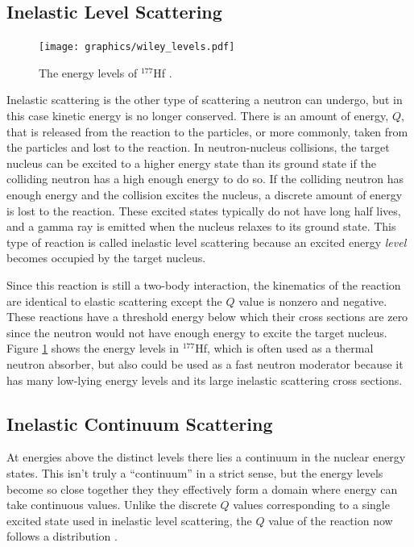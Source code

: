 \subsection{Inelastic Level Scattering}

\begin{figure}[h!]
  \centering
    \texttt{[image: graphics/wiley\_levels.pdf]}
     \caption[The energy levels of $^{177}$Hf.]{The energy levels of $^{177}$Hf \cite{krane}. \label{Elevels}}
\end{figure}

Inelastic scattering is the other type of scattering a neutron can undergo, but in this case kinetic energy is no longer conserved.  There is an amount of energy, $Q$, that is released from the reaction to the particles, or more commonly, taken from the particles and lost to the reaction.  In neutron-nucleus collisions, the target nucleus can be excited to a higher energy state than its ground state if the colliding neutron has a high enough energy to do so.  If the colliding neutron has enough energy and the collision excites the nucleus, a discrete amount of energy is lost to the reaction.  These excited states typically do not have long half lives, and a gamma ray is emitted when the nucleus relaxes to its ground state.  This type of reaction is called inelastic level scattering because an excited energy \emph{level} becomes occupied by the target nucleus.  

Since this reaction is still a two-body interaction, the kinematics of the reaction are identical to elastic scattering except the $Q$ value is nonzero and negative.  These reactions have a threshold energy below which their cross sections are zero since the neutron would not have enough energy to excite the target nucleus.   Figure \ref{Elevels} shows the energy levels in $^{177}$Hf, which is often used as a thermal neutron absorber, but also could be used as a fast neutron moderator because it has many low-lying energy levels and its large inelastic scattering cross sections.


\subsection{Inelastic Continuum Scattering}

At energies above the distinct levels there lies a continuum in the nuclear energy states.  This isn't truly a ``continuum'' in a strict sense, but the energy levels become so close together they they effectively form a domain where energy can take continuous values.  Unlike the discrete $Q$ values corresponding to a single excited state used in inelastic level scattering, the $Q$ value of the reaction now follows a distribution \cite{krane}.  

